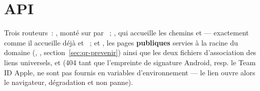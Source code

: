 \chapter{API}

Trois routeurs~: , monté sur
 par ~; , qui accueille les chemins  et  --- exactement
comme il accueille déjà  et ~; et
, les pages \textbf{publiques}
servies à la racine du domaine (, ,
section~\ref{sec:qr-prevenir}) ainsi que les deux fichiers d'association des liens
universels,  et
 (404 tant que l'empreinte de
signature Android, resp. le Team ID Apple, ne sont pas fournis en variables
d'environnement --- le lien ouvre alors le navigateur, dégradation et non panne).

